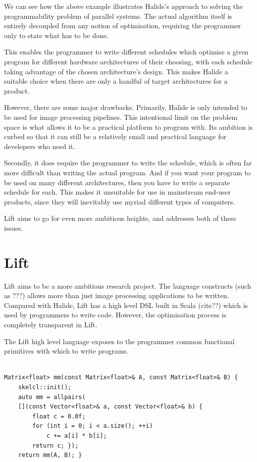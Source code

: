 \documentclass{l4proj}
\begin{document}
We can see how the above example illustrates Halide's approach to solving the programmability problem of parallel systems. The actual algorithm itself is entirely decoupled from any notion of optimisation, requiring the programmer only to state what has to be done.

This enables the programmer to write different schedules which optimise a given program for different hardware architectures of their choosing, with each schedule taking advantage of the chosen architecture's design. This makes Halide a suitable choice when there are only a handful of target architectures for a product.


However, there are some major drawbacks. Primarily, Halide is only intended to be used for image processing pipelines. This intentional limit on the problem space is what allows it to be a practical platform to program with. Its ambition is curbed so that it can still be a relatively small and practical language for developers who need it.

Secondly, it does require the programmer to write the schedule, which is often far more difficult than writing the actual program. And if you want your program to be used on many different architectures, then you have to write a separate schedule for each. This makes it unsuitable for use in mainstream end-user products, since they will inevitably use myriad different types of computers.


Lift aims to go for even more ambitious heights, and addresses both of these issues.
       
\section{Lift}

Lift aims to be a more ambitious research project. The language constructs (such as ???) allows more than just image processing applications to be written. Compared with Halide, Lift has a high level DSL built in Scala (cite??) which is used by programmers to write code. However, the optimisation process is completely transparent in Lift.

The Lift high level language exposes to the programmer common functional primitives with which to write programs.

\begin{lstlisting}[caption={An example of Matrix Multiplication written in SkelCL\citep{steuwer_improving_nodate}, the predecessor to Lift}, keywords={const, Vector, float, int, Matrix, return}]

Matrix<float> mm(const Matrix<float>& A, const Matrix<float>& B) {
    skelcl::init();
    auto mm = allpairs(
    [](const Vector<float>& a, const Vector<float>& b) {
        float c = 0.0f;
        for (int i = 0; i < a.size(); ++i)
            c += a[i] * b[i];
        return c; });
    return mm(A, B); }

\end{lstlisting}
\end{document}
